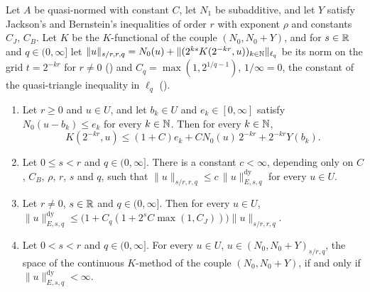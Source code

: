 \begin{theorem}
\label{thm:jackson-bernstein-couple}
\leanok
{}
Let $A$ be quasi-normed with constant $C$, let $N_1$ be subadditive, and let $Y$ satisfy
Jackson's and Bernstein's inequalities of order $r$ with exponent $\rho$ and constants $C_J$,
$C_B$. Let $K$ be the $K$-functional of the couple $(N_0, N_0 + Y)$, and for $s \in \mathbb{R}$ and
$q \in (0, \infty]$ let
$\|u\|_{s/r, r, q} = N_0(u) + \|(2^{ks} K(2^{-kr}, u))_{k \in \mathbb{N}}\|_{\ell_q}$ be its norm on the
grid $t = 2^{-kr}$ for $r \neq 0$ () and
$C_q = \max(1, 2^{1/q - 1})$, $1/\infty = 0$, the constant of the quasi-triangle inequality in
$\ell_q$ ().
\begin{enumerate}
  \item Let $r \geq 0$ and $u \in U$, and let $b_k \in U$ and $e_k \in [0, \infty]$ satisfy
    $N_0(u - b_k) \leq e_k$ for every $k \in \mathbb{N}$. Then for every $k \in \mathbb{N}$,
    \[
      K(2^{-kr}, u) \leq (1 + C) e_k + C N_0(u) \, 2^{-kr} + 2^{-kr} Y(b_k) .
    \]
  \item Let $0 \leq s < r$ and $q \in (0, \infty]$. There is a constant $c < \infty$, depending
    only on $C$, $C_B$, $\rho$, $r$, $s$ and $q$, such that
    $\|u\|_{s/r, r, q} \leq c \, \|u\|^{\mathrm{dy}}_{E, s, q}$ for every $u \in U$.
  \item Let $r \neq 0$, $s \in \mathbb{R}$ and $q \in (0, \infty]$. Then for every $u \in U$,
    $\|u\|^{\mathrm{dy}}_{E, s, q} \leq \bigl(1 + C_q (1 + 2^s C \max(1, C_J))\bigr)
    \|u\|_{s/r, r, q}$.
  \item Let $0 < s < r$ and $q \in (0, \infty]$. For every $u \in U$,
    $u \in (N_0, N_0 + Y)_{s/r, q}$, the space of the continuous $K$-method of the couple
    $(N_0, N_0 + Y)$, if and only if $\|u\|^{\mathrm{dy}}_{E, s, q} < \infty$.
\end{enumerate}
\end{theorem}

